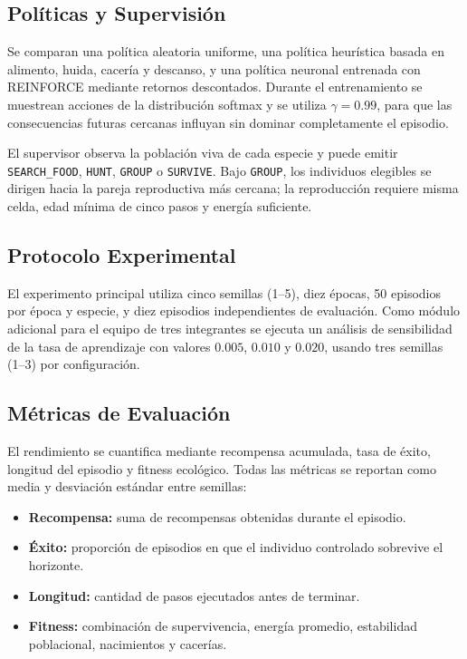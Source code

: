 \documentclass[conference]{IEEEtran}
\begin{document}
\subsection{Políticas y Supervisión}
Se comparan una política aleatoria uniforme, una política heurística basada en
alimento, huida, cacería y descanso, y una política neuronal entrenada con
REINFORCE mediante retornos descontados. Durante el entrenamiento se muestrean
acciones de la distribución softmax y se utiliza $\gamma=0.99$, para que las
consecuencias futuras cercanas influyan sin dominar completamente el episodio.

El supervisor observa la población viva de cada especie y puede emitir
\texttt{SEARCH\_FOOD}, \texttt{HUNT}, \texttt{GROUP} o \texttt{SURVIVE}. Bajo
\texttt{GROUP}, los individuos elegibles se dirigen hacia la pareja
reproductiva más cercana; la reproducción requiere misma celda, edad mínima de
cinco pasos y energía suficiente.

\subsection{Protocolo Experimental}
El experimento principal utiliza cinco semillas (1--5), diez épocas, 50
episodios por época y especie, y diez episodios independientes de evaluación.
Como módulo adicional para el equipo de tres integrantes se ejecuta un análisis
de sensibilidad de la tasa de aprendizaje con valores $0.005$, $0.010$ y
$0.020$, usando tres semillas (1--3) por configuración.

\subsection{Métricas de Evaluación}
El rendimiento se cuantifica mediante recompensa acumulada, tasa de éxito,
longitud del episodio y fitness ecológico. Todas las métricas se reportan como
media y desviación estándar entre semillas:
\begin{itemize}
    \item \textbf{Recompensa:} suma de recompensas obtenidas durante el episodio.
    \item \textbf{Éxito:} proporción de episodios en que el individuo
    controlado sobrevive el horizonte.
    \item \textbf{Longitud:} cantidad de pasos ejecutados antes de terminar.
    \item \textbf{Fitness:} combinación de supervivencia, energía promedio,
    estabilidad poblacional, nacimientos y cacerías.
\end{itemize}
\end{document}
